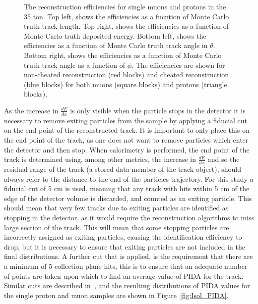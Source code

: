 \begin{figure}[h!]
  \caption[The reconstruction efficiencies for single muons and protons in the 35 ton.]
          {The reconstruction efficiencies for single muons and protons in the 35 ton. Top left, shows the efficiencies as a fucntion of Monte Carlo truth track length. Top right, shows the efficiencies as a function of Monte Carlo truth deposited energy. Bottom left, shows the efficiencies as a function of Monte Carlo truth track angle in $\theta$. Bottom right, shows the efficiencies as a function of Monte Carlo truth track angle as a function of $\phi$. The efficiencies are shown for non-cheated reconstruction (red blocks) and cheated reconstruction (blue blocks) for both muons (square blocks) and protons (triangle blocks).}
  \label{fig:Isol_Effic}
\end{figure}

As the increase in $\frac{dE}{dx}$ is only visible when the particle stops in the detector it is necessary to remove exiting particles from the sample by applying a fiducial cut on the end point of the reconstructed track. It is important to only place this on the end point of the track, as one does not want to remove particles which enter the detector and then stop. When calorimetry is performed, the end point of the track is determined using, among other metrics, the increase in $\frac{dE}{dx}$ and so the residual range of the track (a stored data member of the track object), should always refer to the distance to the end of the particles trajectory. For this study a fiducial cut of 5 cm is used, meaning that any track with hits within 5 cm of the edge of the detector volume is discarded, and counted as an exiting particle. This should mean that very few tracks due to exiting particles are identified as stopping in the detector, as it would require the reconstruction algorithms to miss large section of the track. This will mean that some stopping particles are incorrectly assigned as exiting particles, causing the identification efficiency to drop, but it is necessary to ensure that exiting particles are not included in the final distributions. A further cut that is applied, is the requirement that there are a minimum of 5 collection plane hits, this is to ensure that an adequate number of points are taken upon which to find an average value of PIDA for the track. Similar cuts are described in~\citep{PIDA_Paper}, and the resulting distributions of PIDA values for the single proton and muon samples are shown in Figure~\ref{fig:Isol_PIDA}. \\

